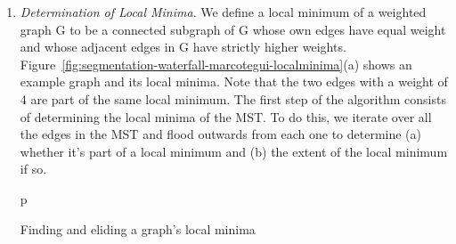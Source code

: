 \begin{enumerate}

\item \emph{Determination of Local Minima}. We define a local minimum of a weighted graph G to be a connected subgraph of G whose own edges have equal weight and whose adjacent edges in G have strictly higher weights. Figure~\ref{fig:segmentation-waterfall-marcotegui-localminima}(a) shows an example graph and its local minima. Note that the two edges with a weight of $4$ are part of the same local minimum. The first step of the algorithm consists of determining the local minima of the MST. To do this, we iterate over all the edges in the MST and flood outwards from each one to determine (a) whether it's part of a local minimum and (b) the extent of the local minimum if so.

\begin{stusubfig}{p}
	\hspace{4mm}%
\caption{Finding and eliding a graph's local minima}
\label{fig:segmentation-waterfall-marcotegui-localminima}
\end{stusubfig}


\end{enumerate}
